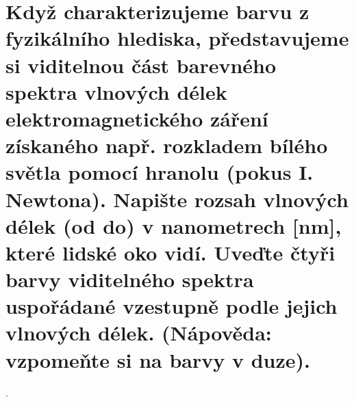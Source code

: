 \section{Když charakterizujeme barvu z fyzikálního hlediska, představujeme si viditelnou část barevného spektra vlnových 
délek elektromagnetického záření získaného např. rozkladem bílého světla pomocí hranolu (pokus I. Newtona). Napište 
rozsah vlnových délek (od do) v nanometrech [nm], které lidské oko vidí. Uveďte čtyři barvy viditelného spektra 
uspořádané vzestupně podle jejich vlnových délek. (Nápověda: vzpomeňte si na barvy v duze).}.